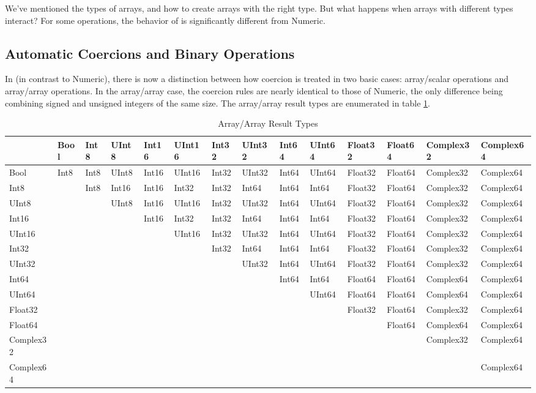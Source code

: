 We've mentioned the types of arrays, and how to create arrays with the right
type.  But what happens when arrays with different types interact?  For 
some operations, the behavior of \numarray{} is significantly different 
from Numeric.

\subsection{Automatic Coercions and Binary Operations}
\label{sec:automatic-coercion-binary-casting}

In \numarray{} (in contrast to Numeric), there is now a distinction between how
coercion is treated in two basic cases: array/scalar operations and array/array
operations. In the array/array case, the coercion rules are nearly identical to
those of Numeric, the only difference being combining signed and unsigned
integers of the same size.  The array/array result types are enumerated in
table \ref{tab:array-array-result-types}.
\begin{table}[h]
\footnotesize
\centering
\caption{Array/Array Result Types}
\label{tab:array-array-result-types}
\begin{tabular}{|l|l|l|l|l|l|l|l|l|l|l|l|l|l|}
\hline
 &Bool&Int8&UInt8&Int16&UInt16&Int32&UInt32&Int64&UInt64&Float32&Float64&Complex32&Complex64\\
\hline
Bool&Int8&Int8&UInt8&Int16&UInt16&Int32&UInt32&Int64&UInt64&Float32&Float64&Complex32&Complex64\\
\hline
Int8& &Int8&Int16&Int16&Int32&Int32&Int64&Int64&Int64&Float32&Float64&Complex32&Complex64\\
\hline
UInt8& & &UInt8&Int16&UInt16&Int32&UInt32&Int64&UInt64&Float32&Float64&Complex32&Complex64\\
\hline
Int16& & & &Int16&Int32&Int32&Int64&Int64&Int64&Float32&Float64&Complex32&Complex64\\
\hline
UInt16& & & & &UInt16&Int32&UInt32&Int64&UInt64&Float32&Float64&Complex32&Complex64\\
\hline
Int32& & & & & &Int32&Int64&Int64&Int64&Float32&Float64&Complex32&Complex64\\
\hline
UInt32& & & & & & &UInt32&Int64&UInt64&Float32&Float64&Complex32&Complex64\\
\hline
Int64& & & & & & & &Int64&Int64&Float64&Float64&Complex64&Complex64\\
\hline
UInt64& & & & & & & & &UInt64&Float64&Float64&Complex64&Complex64\\
\hline
Float32& & & & & & & & & &Float32&Float64&Complex32&Complex64\\
\hline
Float64& & & & & & & & & & &Float64&Complex64&Complex64\\
\hline
Complex32& & & & & & & & & & & &Complex32&Complex64\\
\hline
Complex64& & & & & & & & & & & & &Complex64\\
\hline
\end{tabular}
\end{table}

